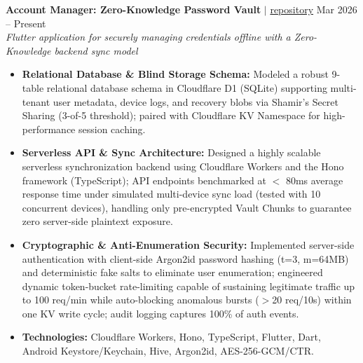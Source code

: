 \documentclass[10pt,a4paper]{article}
\begin{document}
\noindent \textbf{Account Manager: Zero-Knowledge Password Vault} $|$ \href{https://github.com/Chickyo/Account-Manager}{repository} \hfill Mar 2026 -- Present\\
\textit{Flutter application for securely managing credentials offline with a Zero-Knowledge backend sync model}
\begin{itemize}[leftmargin=0.25in, nosep]
    \item \textbf{Relational Database \& Blind Storage Schema:} Modeled a robust 9-table relational database schema in Cloudflare D1 (SQLite) supporting multi-tenant user metadata, device logs, and recovery blobs via Shamir's Secret Sharing (3-of-5 threshold); paired with Cloudflare KV Namespace for high-performance session caching.
    \item \textbf{Serverless API \& Sync Architecture:} Designed a highly scalable serverless synchronization backend using Cloudflare Workers and the Hono framework (TypeScript); API endpoints benchmarked at $<$ 80ms average response time under simulated multi-device sync load (tested with 10 concurrent devices), handling only pre-encrypted Vault Chunks to guarantee zero server-side plaintext exposure.
    \item \textbf{Cryptographic \& Anti-Enumeration Security:} Implemented server-side authentication with client-side Argon2id password hashing (t=3, m=64MB) and deterministic fake salts to eliminate user enumeration; engineered dynamic token-bucket rate-limiting capable of sustaining legitimate traffic up to 100 req/min while auto-blocking anomalous bursts ($>$20 req/10s) within one KV write cycle; audit logging captures 100\% of auth events.
    \item \textbf{Technologies:} Cloudflare Workers, Hono, TypeScript, Flutter, Dart, Android Keystore/Keychain, Hive, Argon2id, AES-256-GCM/CTR.
\end{itemize}
\vspace{10pt}
\end{document}
